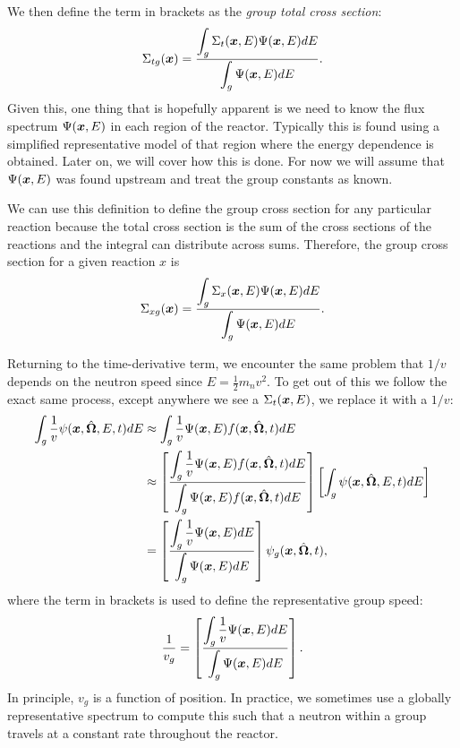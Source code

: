 We then define the term in brackets as the \emph{group total cross section}:
\begin{align}
  \Sigma_{tg}(\bm{x}) = \dfrac{ \displaystyle\int_g  \Sigma_t(\bm{x},E) \Psi(\bm{x},E) dE }{ \displaystyle\int_g \Psi(\bm{x},E)  dE } .
\end{align}
Given this, one thing that is hopefully apparent is we need to know the flux spectrum $\Psi(\bm{x},E)$ in each region of the reactor. Typically this is found using a simplified representative model of that region where the energy dependence is obtained. Later on, we will cover how this is done. For now we will assume that $\Psi(\bm{x},E)$ was found upstream and treat the group constants as known. 

We can use this definition to define the group cross section for any particular reaction because the total cross section is the sum of the cross sections of the reactions and the integral can distribute across sums. Therefore, the group cross section for a given reaction $x$ is
\begin{align}
  \Sigma_{xg}(\bm{x}) = \dfrac{ \displaystyle\int_g  \Sigma_x(\bm{x},E) \Psi(\bm{x},E) dE }{ \displaystyle\int_g \Psi(\bm{x},E)  dE } .
\end{align}

Returning to the time-derivative term, we encounter the same problem that $1/v$ depends on the neutron speed since $E = \frac{1}{2} m_n v^2$. To get out of this we follow the exact same process, except anywhere we see a $\Sigma_t(\bm{x},E)$, we replace it with a $1/v$:
\begin{align}
  \int_g  \dfrac{1}{v} \psi(\bm{x},\hat{\mathbf{\Omega}},E,t) dE &\approx \int_g  \dfrac{1}{v} \Psi(\bm{x},E) f(\bm{x},\hat{\mathbf{\Omega}},t) dE \nonumber\\
  &\approx \left[ \dfrac{ \displaystyle\int_g  \dfrac{1}{v}  \Psi(\bm{x},E) f(\bm{x},\hat{\mathbf{\Omega}},t) dE }{ \displaystyle\int_g \Psi(\bm{x},E) f(\bm{x},\hat{\mathbf{\Omega}},t) dE } \right] \left[ \int_g  \psi(\bm{x},\hat{\mathbf{\Omega}},E,t) dE \right] \nonumber \\
  &= \left[ \dfrac{ \displaystyle\int_g  \dfrac{1}{v}  \Psi(\bm{x},E) dE }{ \displaystyle\int_g \Psi(\bm{x},E)  dE } \right] \psi_g(\bm{x},\hat{\mathbf{\Omega}},t) ,
\end{align}
where the term in brackets is used to define the representative group speed:
\begin{align}
  \frac{1}{v_g} = \left[ \dfrac{ \displaystyle\int_g  \dfrac{1}{v}  \Psi(\bm{x},E) dE }{ \displaystyle\int_g \Psi(\bm{x},E)  dE } \right] .
\end{align}
In principle, $v_g$ is a function of position. In practice, we sometimes use a globally representative spectrum to compute this such that a neutron within a group travels at a constant rate throughout the reactor. 

